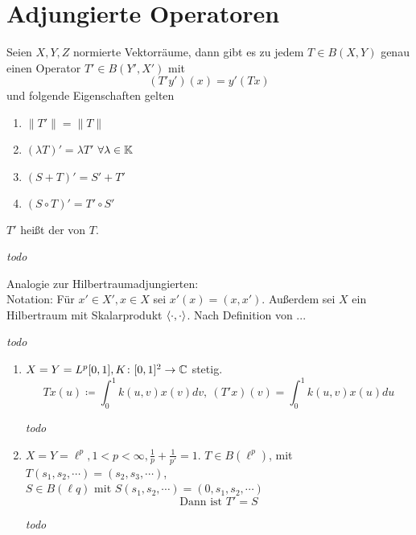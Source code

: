 

\section{Adjungierte Operatoren}


\begin{satz}
	Seien $X, Y, Z$ normierte Vektorräume, dann gibt es zu jedem $T \in B(X, Y)$ genau einen Operator $T' \in B(Y', X')$ mit 
	\[ (T' y')(x) = y'(T x) \]
	und folgende Eigenschaften gelten
	\begin{enumerate}[label=(\roman*\upshape)]
		\item $\| T' \| = \| T \|$
		\item $( \lambda T )' = \lambda T'$ $\forall \lambda \in \mathbb{K}$
		\item $(S + T)' = S' + T'$
		\item $(S \circ T)' = T' \circ S'$
	\end{enumerate}	
	$T'$ hei{\ss}t der  von $T$.
\end{satz}

\begin{beweis}
	\textit{todo} %
\end{beweis}


\begin{bemerkung}
	Analogie zur Hilbertraumadjungierten: \\
	Notation: Für $x' \in X', x \in X$ sei $x'(x) = (x, x')$. Außerdem sei $X$ ein Hilbertraum mit Skalarprodukt $\langle \cdot , \cdot \rangle$.  Nach Definition von ... %
\end{bemerkung}

\begin{beweis}
	\textit{todo} %
\end{beweis}


\begin{beispiel}
	\begin{enumerate}[label=\alph*\upshape)]
		\item $X = Y = L^{p}[0, 1], K \colon [0, 1]^{2} \rightarrow \mathbb{C}$ stetig.
			\[ T x(u) \coloneqq \int_{0}^{1} k(u, v) x(v) dv, ~ \left( T' x \right)(v) = \int_{0}^{1} k(u, v) x(u) du \]
		  \begin{beweis}
		  	\textit{todo} %
		  \end{beweis}
		\item $X =Y = \ell^{p}, 1 < p < \infty, \frac{1}{p} + \frac{1}{p'} = 1$. $T \in B(\ell^{p})$, mit $T(s_{1}, s_{2}, \cdots) = (s_{2}, s_{3}, \cdots)$, \\
			$S \in B(\ell{q})$ mit $S(s_{1}, s_{2}, \cdots) = (0, s_{1}, s_{2}, \cdots)$
			\[ \text{Dann ist } T' = S \]
		  \begin{beweis}
		  	\textit{todo} %
		  \end{beweis}
	\end{enumerate}
\end{beispiel}


